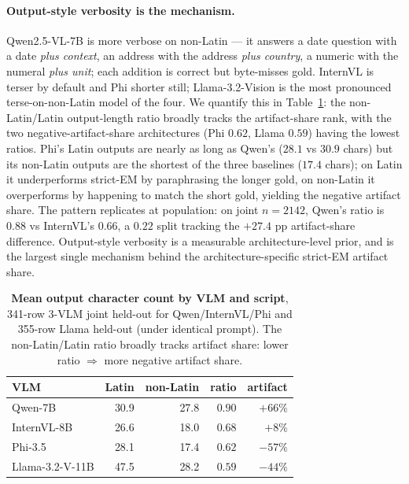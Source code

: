 \paragraph{Output-style verbosity is the mechanism.}
Qwen2.5-VL-7B is more verbose on non-Latin --- it answers a date question with a date \emph{plus context}, an address with the address \emph{plus country}, a numeric with the numeral \emph{plus unit}; each addition is correct but byte-misses gold. InternVL is terser by default and Phi shorter still; Llama-3.2-Vision is the most pronounced terse-on-non-Latin model of the four. We quantify this in Table~\ref{tab:verbosity}: the non-Latin/Latin output-length ratio broadly tracks the artifact-share rank, with the two negative-artifact-share architectures (Phi $0.62$, Llama $0.59$) having the lowest ratios. Phi's Latin outputs are nearly as long as Qwen's ($28.1$ vs $30.9$ chars) but its non-Latin outputs are the shortest of the three baselines ($17.4$ chars); on Latin it underperforms strict-EM by paraphrasing the longer gold, on non-Latin it overperforms by happening to match the short gold, yielding the negative artifact share. The pattern replicates at population: on joint $n=2142$, Qwen's ratio is $0.88$ vs InternVL's $0.66$, a $0.22$ split tracking the $+27.4$ pp artifact-share difference. Output-style verbosity is a measurable architecture-level prior, and is the largest single mechanism behind the architecture-specific strict-EM artifact share.

\begin{table}[t]
\centering
\small
\begin{tabular}{lrrrr}
\toprule
VLM & Latin & non-Latin & ratio & artifact \\
\midrule
Qwen-7B            & 30.9 & 27.8 & $0.90$ & $+66\%$ \\
InternVL-8B         & 26.6 & 18.0 & $0.68$ & $+8\%$ \\
Phi-3.5             & 28.1 & 17.4 & $0.62$ & $-57\%$ \\
Llama-3.2-V-11B    & 47.5 & 28.2 & $0.59$ & $-44\%$ \\
\bottomrule
\end{tabular}
\caption{\textbf{Mean output character count by VLM and script}, 341-row 3-VLM joint held-out for Qwen/InternVL/Phi and 355-row Llama held-out (under identical prompt). The non-Latin/Latin ratio broadly tracks artifact share: lower ratio $\Rightarrow$ more negative artifact share.}
\label{tab:verbosity}
\end{table}

